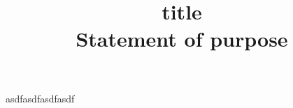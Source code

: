 \documentclass{article}
\begin{document}
\title{title\\
\large Statement of purpose}
\author{}
\date{}

\maketitle
asdfasdfasdfasdf
\end{document}
